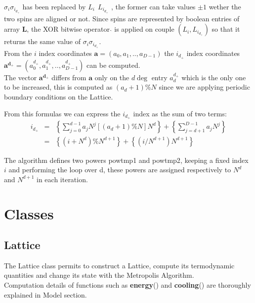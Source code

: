 \documentclass[11pt,a4paper]{article}
\begin{document}
$\sigma_i\sigma_{i_{d_+}}$ has been replaced by $L_i \ \hat{} \ L_{i_{d_+}}$ , the former can take values $\pm1$ wether the two spins are aligned or not. Since spins are represented by boolean entries of array $\mathbf{L}$, the XOR bitwise operator $\hat{}$ is applied on couple $(L_i,L_{i_{d_+}})$ so that it returns the same value of $\sigma_i\sigma_{i_{d_+}}$. \\   
\vspace{0.1cm}
From the $i$ index coordinates $\mathbf{a} = (a_0,a_1,..,a_{D-1})$ the $i_{d_+}$ index coordinates 
$\mathbf{a^{d_+}} = (a^{d_+}_0,a^{d_+}_1,..,a^{d_+}_{D-1})$ can be computed. \\
The vector $\mathbf{a^{d_+}}$ differs from $\mathbf{a}$
only on the $d\deg$ entry $a^{d_+}_d$ which is the only one to be increased, this is computed as $(a_d+1)\%N$ since we are applying periodic boundary conditions on the Lattice. 

From this formulas we can express the $i_{d_+}$ index as the sum of two terms:
\begin{eqnarray*}
i_{d_+} &=& \left\{ \sum_{j = 0}^{d-1}a_jN^j  [(a_d + 1)\%N]N^d \right\} + \left\{ \sum_{j = d+1}^{D-1}a_jN^j \right\}  \\
&=& \left\{(i + N^d)\%N^{d+1} \right\}  +  \left\{ (i/N^{d+1})N^{d+1}  \right\} 
\end{eqnarray*}

The algorithm defines two powers \textsf{pow\textunderscore tmp1} and \textsf{pow\textunderscore tmp2}, keeping a fixed index $i$ and performing the loop over d, these powers are assigned respectively to $N^d$ and $N^{d+1}$ in each iteration.

\newpage 

\section*{Classes}
	
\subsection*{Lattice}

The Lattice class permits to construct a Lattice, compute its termodynamic quantities 
and change its state with the Metropolis Algorithm. \\	  
Computation details of functions such as \textbf{energy}() and \textbf{cooling}() are thoroughly explained in Model section. \\ 
\end{document}
